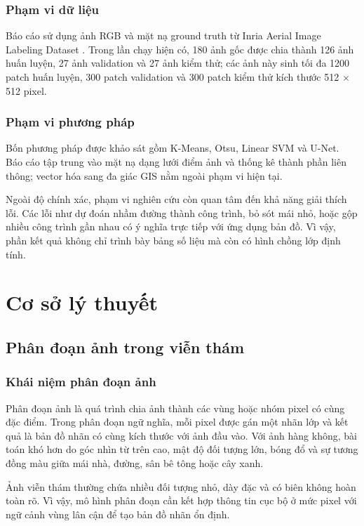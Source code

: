 \documentclass[12pt,a4paper]{report}
\begin{document}
\subsection*{Phạm vi dữ liệu}

Báo cáo sử dụng ảnh RGB và mặt nạ ground truth từ Inria Aerial Image Labeling Dataset \cite{maggiori2017inria}. Trong lần chạy hiện có, 180 ảnh gốc được chia thành 126 ảnh huấn luyện, 27 ảnh validation và 27 ảnh kiểm thử; các ảnh này sinh tối đa 1200 patch huấn luyện, 300 patch validation và 300 patch kiểm thử kích thước 512 $\times$ 512 pixel.

\subsection*{Phạm vi phương pháp}

Bốn phương pháp được khảo sát gồm K-Means, Otsu, Linear SVM và U-Net. Báo cáo tập trung vào mặt nạ dạng lưới điểm ảnh và thống kê thành phần liên thông; vector hóa sang đa giác GIS nằm ngoài phạm vi hiện tại.

Ngoài độ chính xác, phạm vi nghiên cứu còn quan tâm đến khả năng giải thích lỗi. Các lỗi như dự đoán nhầm đường thành công trình, bỏ sót mái nhỏ, hoặc gộp nhiều công trình gần nhau có ý nghĩa trực tiếp với ứng dụng bản đồ. Vì vậy, phần kết quả không chỉ trình bày bảng số liệu mà còn có hình chồng lớp định tính.

\chapter{Cơ sở lý thuyết}

\section{Phân đoạn ảnh trong viễn thám}

\subsection{Khái niệm phân đoạn ảnh}

Phân đoạn ảnh là quá trình chia ảnh thành các vùng hoặc nhóm pixel có cùng đặc điểm. Trong phân đoạn ngữ nghĩa, mỗi pixel được gán một nhãn lớp và kết quả là bản đồ nhãn có cùng kích thước với ảnh đầu vào. Với ảnh hàng không, bài toán khó hơn do góc nhìn từ trên cao, mật độ đối tượng lớn, bóng đổ và sự tương đồng màu giữa mái nhà, đường, sân bê tông hoặc cây xanh.

Ảnh viễn thám thường chứa nhiều đối tượng nhỏ, dày đặc và có biên không hoàn toàn rõ. Vì vậy, mô hình phân đoạn cần kết hợp thông tin cục bộ ở mức pixel với ngữ cảnh vùng lân cận để tạo bản đồ nhãn ổn định.
\end{document}
